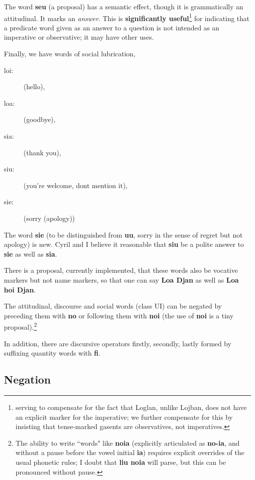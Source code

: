 \documentclass[12pt]{book}
\begin{document}
{The word {\bf seu} (a proposal) has a semantic effect, though it is grammatically an attitudinal.  It marks an {\em answer\/}.  This
is {\bf significantly useful}\footnote{serving to compensate for the fact that Loglan, unlike Lojban, does not have an explicit marker for the imperative; we further compensate for this by insisting that tense-marked gasents are observatives, not imperatives.} for indicating that a predicate word given as an answer to a question is not intended as an imperative or observative; it may have other uses.

Finally, we have words of social lubrication, 

\begin{description}
\item[loi:]  (hello),

\item[loa:]  (goodbye), 

\item[sia:]  (thank you), 

\item[siu:]   (you're welcome, dont mention it),

\item[sie:]  (sorry (apology))

\end{description}

The word {\bf sie} (to be distinguished from {\bf uu}, sorry in the sense of regret but not apology) is new.   Cyril and I believe it reasonable that {\bf siu} be a polite answer to {\bf sie} as well as {\bf sia}.   

There is a proposal, currently implemented, that these words also be vocative markers but not name markers, so that one can say {\bf Loa Djan} as well as {\bf Loa hoi Djan}.

The attitudinal, discourse and social words (class UI) can be negated by preceding them with {\bf no} or following them with {\bf noi} (the use of {\bf noi} is a tiny proposal).\footnote{The ability to write ``words" like {\bf noia} (explicitly articulated as {\bf no-ia}, and without a pause before the vowel initial {\bf ia})  requires explicit overrides of the usual phonetic rules; I doubt that {\bf liu noia} will parse, but this can be pronounced without pause.}

In addition, there are discursive operators firstly, secondly, lastly formed by suffixing quantity words with {\bf fi}.

\subsection{Negation}

}
\end{document}
